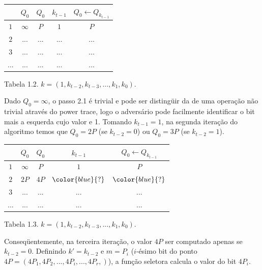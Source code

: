 \begin{center}
    \begin{tabular}{|c|c|c|c|c|}
	    \hline
		    \   & $Q_{0}$  & $Q_{0}$ & $k_{t-1}$ & $Q_{0} \leftarrow Q_{k_{t-1}}$\\
	    \hline
	        $1$ & $\infty$ &     $P$ &       $1$ & $P$\\
	    \hline
		    $2$ & ... & ... & ... & ...\\
	    \hline
		    $3$ & ... & ... & ...& ... \\
	    \hline
		    ... & ... & ... & ...& ... \\
	    \hline
    \end{tabular}

    Tabela 1.2. $k = (1, k_{t-2}, k_{t-3}, ..., k_{1}, k_{0})$.
\end{center}

Dado $Q_{0} = \infty$, o passo 2.1 \'{e} trivial e pode ser disting\"{u}ir da de uma opera\c{c}\~{a}o n\~{a}o trivial
atrav\'{e}s do power trace, logo o advers\'{a}rio pode facilmente identificar o bit mais a esquerda cujo valor e 1. Tomando $k_{t-1}= 1$, na segunda itera\c{c}\~{a}o do algoritmo temos que $Q_{0} = 2P$ (se $k_{t-2} = 0$) ou $Q_{0} = 3P$ (se $k_{t-2} = 1$).

\begin{center}
    \begin{tabular}{|c|c|c|c|c|}
	    \hline
		    \   & $Q_{0}$  & $Q_{0}$ & $k_{t-1}$ & $Q_{0} \leftarrow Q_{k_{t-1}}$\\
	    \hline
	        $1$ & $\infty$ &     $P$ &       $1$ & $P$\\
	    \hline
		    $2$ & $2P$ & $4P$ & $\color{blue}{?}$ & $\color{blue}{?}$ \\
	    \hline
		    $3$ & ... & ... & ...& ... \\
	    \hline
		    ... & ... & ... & ...& ... \\
	    \hline
    \end{tabular}

    Tabela 1.3. $k = (1, k_{t-2}, k_{t-3}, ..., k_{1}, k_{0})$.
\end{center}

Conseq\"{u}entemente, na terceira itera\c{c}\~{a}o, o valor $4P$ ser computado apenas se $k_{t-2} = 0$. Definindo $k' = k_{t-2}$ e $m = P_{i}$ ($i$-\'{e}simo bit do ponto $4P = (4P_{1} , 4P_{2} , ..., 4P_{i} , ..., 4P_{r} , )$), a fun\c{c}\~{a}o seletora calcula o valor do bit $4P_{i}$.

